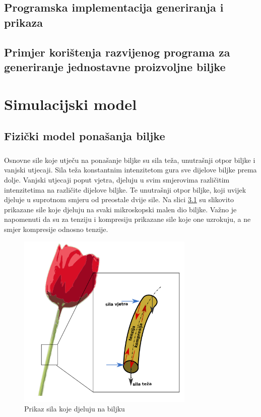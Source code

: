 \documentclass[times, utf8, diplomski]{fer}
\begin{document}
\section{Programska implementacija generiranja i prikaza}

\section{Primjer korištenja razvijenog programa za generiranje jednostavne proizvoljne biljke}

\chapter{Simulacijski model}
\section{Fizički model ponašanja biljke}
\paragraph{}
Osnovne sile koje utječu na ponašanje biljke su sila teža, unutrašnji otpor 
biljke i vanjski utjecaji. Sila teža konstantnim intenzitetom gura sve dijelove 
biljke prema dolje. Vanjski utjecaji poput vjetra, djeluju u svim smjerovima 
različitim intenzitetima na različite dijelove biljke. Te unutrašnji otpor 
biljke, koji uvijek djeluje u suprotnom smjeru od preostale dvije sile. Na 
slici \ref{fig:31-1} su slikovito prikazane sile koje djeluju na svaki mikroskopski malen 
dio biljke. Važno je napomenuti da su za tenziju i kompresiju prikazane sile koje one 
uzrokuju, a ne smjer kompresije odnosno tenzije.

\begin{figure}[h]
	\centering
	\includegraphics[width=0.75\textwidth]{img/31-1}
	\caption{Prikaz sila koje djeluju na biljku}
	\label{fig:31-1}
\end{figure}
\end{document}
